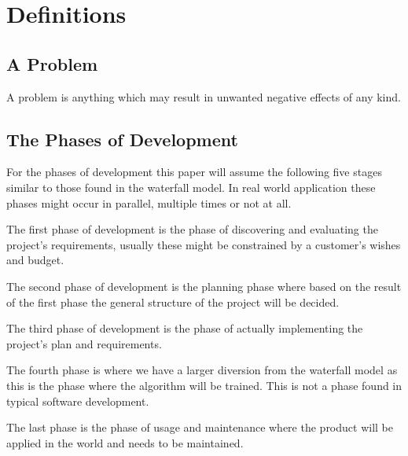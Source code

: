 \section{Definitions}

\subsection{A Problem}
A problem is anything which may result in unwanted negative effects of any kind.

\subsection{The Phases of Development}
For the phases of development this paper will assume the following five stages similar to those found in the waterfall model.
In real world application these phases might occur in parallel, multiple times or not at all.

The first phase of development is the phase of discovering and evaluating the project's requirements, usually these might be constrained by a customer's wishes and budget.

The second phase of development is the planning phase where based on the result of the first phase the general structure of the project will be decided.

The third phase of development is the phase of actually implementing the project's plan and requirements.

The fourth phase is where we have a larger diversion from the waterfall model as this is the phase where the algorithm will be trained. This is not a phase found in typical software development.

The last phase is the phase of usage and maintenance where the product will be applied in the world and needs to be maintained.